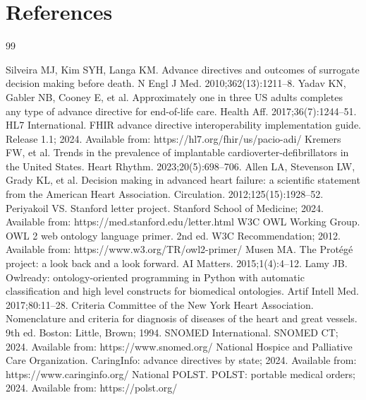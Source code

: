 \documentclass[10pt]{article}
\begin{document}
\section{References}
\begingroup
\renewcommand{\section}[2]{} %
\makeatletter\renewcommand{\@biblabel}[1]{#1.}\makeatother %
\begin{thebibliography}{99}
\footnotesize
\setlength{\itemsep}{0pt}
\setlength{\parskip}{0pt}
\setlength{\labelsep}{0.4em}

 Silveira MJ, Kim SYH, Langa KM. Advance directives and outcomes of surrogate decision making before death. N Engl J Med. 2010;362(13):1211--8.
 Yadav KN, Gabler NB, Cooney E, et al. Approximately one in three US adults completes any type of advance directive for end-of-life care. Health Aff. 2017;36(7):1244--51.
 HL7 International. FHIR advance directive interoperability implementation guide. Release 1.1; 2024. Available from: https://hl7.org/fhir/us/pacio-adi/
 Kremers FW, et al. Trends in the prevalence of implantable cardioverter-defibrillators in the United States. Heart Rhythm. 2023;20(5):698--706.
 Allen LA, Stevenson LW, Grady KL, et al. Decision making in advanced heart failure: a scientific statement from the American Heart Association. Circulation. 2012;125(15):1928--52.
 Periyakoil VS. Stanford letter project. Stanford School of Medicine; 2024. Available from: https://med.stanford.edu/letter.html
 W3C OWL Working Group. OWL 2 web ontology language primer. 2nd ed. W3C Recommendation; 2012. Available from: https://www.w3.org/TR/owl2-primer/
 Musen MA. The Prot\'eg\'e project: a look back and a look forward. AI Matters. 2015;1(4):4--12.
 Lamy JB. Owlready: ontology-oriented programming in Python with automatic classification and high level constructs for biomedical ontologies. Artif Intell Med. 2017;80:11--28.
 Criteria Committee of the New York Heart Association. Nomenclature and criteria for diagnosis of diseases of the heart and great vessels. 9th ed. Boston: Little, Brown; 1994.
 SNOMED International. SNOMED CT; 2024. Available from: https://www.snomed.org/
 National Hospice and Palliative Care Organization. CaringInfo: advance directives by state; 2024. Available from: https://www.caringinfo.org/
 National POLST. POLST: portable medical orders; 2024. Available from: https://polst.org/

\end{thebibliography}
\endgroup
\end{document}
